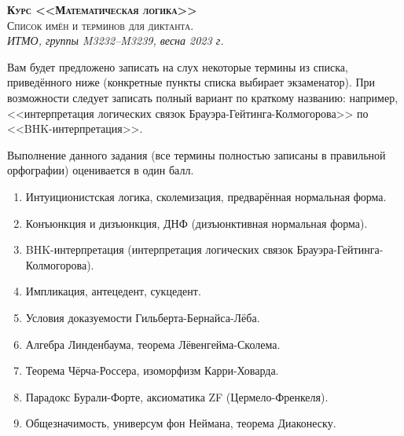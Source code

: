 \documentclass[11pt,a4paper,oneside]{scrartcl}
\begin{document}
\pagestyle{empty}

\begin{center}
{\large\scshape\bfseries Курс <<Математическая логика>>}\\
{\large\scshape Список имён и терминов для диктанта.}\\
\itshape ИТМО, группы M3232--M3239, весна 2023 г.
\end{center}


Вам будет предложено записать на слух некоторые термины из списка, приведённого ниже 
(конкретные пункты списка выбирает экзаменатор). При возможности следует записать полный вариант 
по краткому названию: например, <<интерпретация логических связок Брауэра-Гейтинга-Колмогорова>> 
по <<BHK-интерпретация>>.

Выполнение данного задания (все термины полностью записаны в правильной орфографии) 
оценивается в один балл.

\begin{enumerate}
\item Интуиционистская логика, сколемизация, предварённая нормальная форма.
\item Конъюнкция и дизъюнкция, ДНФ (дизъюнктивная нормальная форма).
\item BHK-интерпретация (интерпретация логических связок Брауэра-Гейтинга-Колмогорова).
\item Импликация, антецедент, сукцедент.
\item Условия доказуемости Гильберта-Бернайса-Лёба.
\item Алгебра Линденбаума, теорема Лёвенгейма-Сколема.
\item Теорема Чёрча-Россера, изоморфизм Карри-Ховарда.
\item Парадокс Бурали-Форте, аксиоматика ZF (Цермело-Френкеля).
\item Общезначимость, универсум фон Неймана, теорема Диаконеску.
\end{enumerate}
\end{document}
